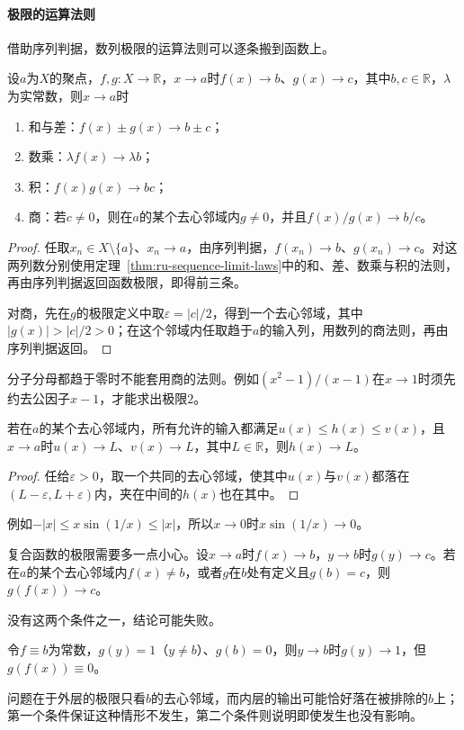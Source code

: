 \paragraph{极限的运算法则}
借助序列判据，数列极限的运算法则可以逐条搬到函数上。
\begin{theorem}[函数极限的运算法则]
\label{thm:ru-function-limit-laws}
设$a$为$X$的聚点，$f,g:X\to\mathbb R$，$x\to a$时$f(x)\to b$、$g(x)\to c$，其中$b,c\in\mathbb R$，$\lambda$为实常数，则$x\to a$时
\begin{enumerate}
 \item 和与差：$f(x)\pm g(x)\to b\pm c$；
 \item 数乘：$\lambda f(x)\to\lambda b$；
 \item 积：$f(x)g(x)\to bc$；
 \item 商：若$c\neq0$，则在$a$的某个去心邻域内$g\neq0$，并且$f(x)/g(x)\to b/c$。
\end{enumerate}
\end{theorem}
\begin{proof}
任取$x_n\in X\setminus\{a\}$、$x_n\to a$，由序列判据，$f(x_n)\to b$、$g(x_n)\to c$。对这两列数分别使用定理~\ref{thm:ru-sequence-limit-laws}中的和、差、数乘与积的法则，再由序列判据返回函数极限，即得前三条。

对商，先在$g$的极限定义中取$\varepsilon=|c|/2$，得到一个去心邻域，其中$|g(x)|>|c|/2>0$；在这个邻域内任取趋于$a$的输入列，用数列的商法则，再由序列判据返回。
\end{proof}
分子分母都趋于零时不能套用商的法则。例如$(x^2-1)/(x-1)$在$x\to1$时须先约去公因子$x-1$，才能求出极限$2$。

\begin{theorem}[函数极限的夹逼定理]
\label{thm:ru-function-squeeze}
若在$a$的某个去心邻域内，所有允许的输入都满足$u(x)\leq h(x)\leq v(x)$，且$x\to a$时$u(x)\to L$、$v(x)\to L$，其中$L\in\mathbb R$，则$h(x)\to L$。
\end{theorem}
\begin{proof}
任给$\varepsilon>0$，取一个共同的去心邻域，使其中$u(x)$与$v(x)$都落在$(L-\varepsilon,L+\varepsilon)$内，夹在中间的$h(x)$也在其中。
\end{proof}
例如$-|x|\leq x\sin(1/x)\leq|x|$，所以$x\to0$时$x\sin(1/x)\to0$。

复合函数的极限需要多一点小心。设$x\to a$时$f(x)\to b$，$y\to b$时$g(y)\to c$。若在$a$的某个去心邻域内$f(x)\neq b$，或者$g$在$b$处有定义且$g(b)=c$，则$g(f(x))\to c$。

没有这两个条件之一，结论可能失败。
\begin{example}[复合函数极限的条件不能省]
\label{ex:ru-composite-limit-failure}
令$f\equiv b$为常数，$g(y)=1$（$y\neq b$）、$g(b)=0$，则$y\to b$时$g(y)\to1$，但$g(f(x))\equiv0$。
\end{example}
问题在于外层的极限只看$b$的去心邻域，而内层的输出可能恰好落在被排除的$b$上；第一个条件保证这种情形不发生，第二个条件则说明即使发生也没有影响。

